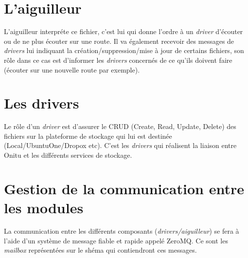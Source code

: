 \section{L'aiguilleur}
L'aiguilleur interpréte ce fichier, c'est lui qui donne l'ordre à un \emph{driver} d'écouter ou de ne plus écouter sur une route.
Il va également recevoir des messages de \emph{drivers} lui indiquant la création/suppression/mise à jour de certains fichiers, son rôle dans ce cas est d'informer les \emph{drivers} concernés de ce qu'ils doivent faire (écouter sur une nouvelle route par exemple).


\section{Les drivers}
Le rôle d'un \emph{driver} est d'assurer le CRUD (Create, Read, Update, Delete) des fichiers sur la plateforme de stockage qui lui est destinée (Local/UbuntuOne/Dropox etc).
C'est les \emph{drivers} qui réalisent la liaison entre Onitu et les différents services de stockage.


\section{Gestion de la communication entre les modules}
La communication entre les différents composants (\emph{drivers/aiguilleur}) se fera à l'aide d'un système de message fiable et rapide appelé ZeroMQ. Ce sont les \emph{mailbox} représentées sur le shéma qui contiendront ces messages.
